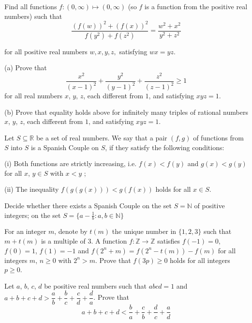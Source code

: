 \item[\textbf{A1.}]
Find all functions 
$ f: (0, \infty) \mapsto (0, \infty)$
 (so 
$ f$
 is a function from the positive real numbers) such that
\[ \frac {\left( f(w) \right)^2 + \left( f(x) \right)^2}{f(y^2) + f(z^2) } = \frac {w^2 + x^2}{y^2 + z^2}
\]

for all positive real numbers 
$ w,x,y,z,$
 satisfying 
$ wx = yz.$

\item[\textbf{A2.}]
(a)
 Prove that
\[\frac {x^{2}}{\left(x - 1\right)^{2}} + \frac {y^{2}}{\left(y - 1\right)^{2}} + \frac {z^{2}}{\left(z - 1\right)^{2}} \geq 1\]
 for all real numbers 
$x$, 
$y$, 
$z$, 
 each different from 
$1$, 
 and satisfying 
$xyz=1$.

(b)
 Prove that equality holds above for infinitely many triples of rational numbers 
$x$, 
$y$, 
$z$, 
 each different from 
$1$, 
 and satisfying 
$xyz=1$.

\item[\textbf{A3.}]
Let 
$ S\subseteq\mathbb{R}$
 be a set of real numbers. We say that a pair 
$ (f, g)$
 of functions from 
$ S$
 into 
$ S$
 is a 
Spanish Couple
 on 
$ S$, 
 if they satisfy the following conditions:


(i) Both functions are strictly increasing, i.e. 
$ f(x) < f(y)$
 and 
$ g(x) < g(y)$
 for all 
$ x$, 
 $ y\in S$
 with 
$ x < y$
;

(ii) The inequality 
$ f\left(g\left(g\left(x\right)\right)\right) < g\left(f\left(x\right)\right)$
 holds for all 
$ x\in S$.

Decide whether there exists a Spanish Couple
on the set 
$ S = \mathbb{N}$
 of positive integers;
on the set 
$ S = \{a - \frac {1}{b}: a, b\in\mathbb{N}\}$

\item[\textbf{A4.}]
For an integer 
$ m$, 
 denote by 
$ t(m)$
 the unique number in 
$ \{1, 2, 3\}$
 such that 
$ m + t(m)$
 is a multiple of 
$ 3$.
 A function 
$ f: \mathbb{Z}\to\mathbb{Z}$
 satisfies 
$ f( - 1) = 0$, 
 $ f(0) = 1$, 
$ f(1) = - 1$
 and 
$ f\left(2^{n} + m\right) = f\left(2^n - t(m)\right) - f(m)$
 for all integers 
$ m$, 
$ n\ge 0$
 with 
$ 2^n > m$.
 Prove that 
$ f(3p)\ge 0$
 holds for all integers 
$ p\ge 0$.

\item[\textbf{A5.}]
Let 
$ a$, 
$ b$, 
$ c$, 
$ d$
 be positive real numbers such that 
$ abcd = 1$
 and 
$ a + b + c + d > \dfrac{a}{b} + \dfrac{b}{c} + \dfrac{c}{d} + \dfrac{d}{a}$.
 Prove that
\[ a + b + c + d < \dfrac{b}{a} + \dfrac{c}{b} + \dfrac{d}{c} + \dfrac{a}{d}\]

